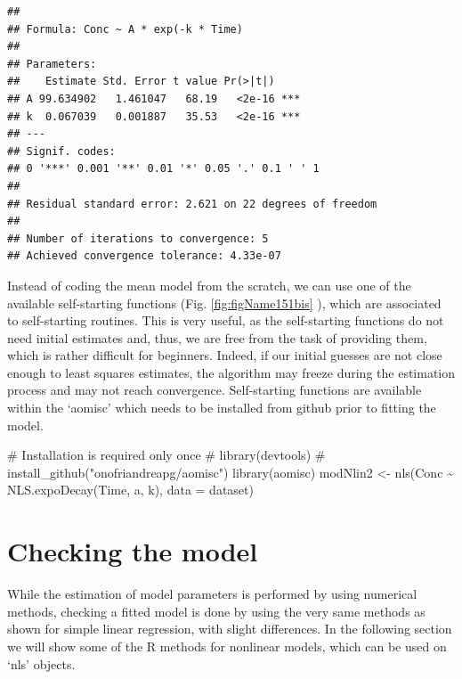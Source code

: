 \documentclass[a4paper,12pt,oneside]{book}
\newenvironment{Shaded}{\begin{snugshade}}{\end{snugshade}}
\newcommand{\SpecialCharTok}[1]{#1}
\newcommand{\CommentTok}[1]{#1}
\newcommand{\OtherTok}[1]{#1}
\newcommand{\FunctionTok}[1]{#1}
\newcommand{\AttributeTok}[1]{#1}
\newcommand{\NormalTok}[1]{#1}
\begin{document}
\begin{verbatim}
## 
## Formula: Conc ~ A * exp(-k * Time)
## 
## Parameters:
##    Estimate Std. Error t value Pr(>|t|)    
## A 99.634902   1.461047   68.19   <2e-16 ***
## k  0.067039   0.001887   35.53   <2e-16 ***
## ---
## Signif. codes:  
## 0 '***' 0.001 '**' 0.01 '*' 0.05 '.' 0.1 ' ' 1
## 
## Residual standard error: 2.621 on 22 degrees of freedom
## 
## Number of iterations to convergence: 5 
## Achieved convergence tolerance: 4.33e-07
\end{verbatim}

Instead of coding the mean model from the scratch, we can use one of the available self-starting functions (Fig. \ref{fig:figName151bis} ), which are associated to self-starting routines. This is very useful, as the self-starting functions do not need initial estimates and, thus, we are free from the task of providing them, which is rather difficult for beginners. Indeed, if our initial guesses are not close enough to least squares estimates, the algorithm may freeze during the estimation process and may not reach convergence. Self-starting functions are available within the `aomisc' which needs to be installed from github prior to fitting the model.

\begin{Shaded}
\begin{Highlighting}[]
\CommentTok{\# Installation is required only once}
\CommentTok{\# library(devtools)}
\CommentTok{\# install\_github("onofriandreapg/aomisc")}
\FunctionTok{library}\NormalTok{(aomisc)}
\NormalTok{modNlin2 }\OtherTok{\textless{}{-}} \FunctionTok{nls}\NormalTok{(Conc }\SpecialCharTok{\textasciitilde{}} \FunctionTok{NLS.expoDecay}\NormalTok{(Time, a, k),}
               \AttributeTok{data =}\NormalTok{ dataset)}
\end{Highlighting}
\end{Shaded}

\hypertarget{checking-the-model}{%
\section{Checking the model}\label{checking-the-model}}

While the estimation of model parameters is performed by using numerical methods, checking a fitted model is done by using the very same methods as shown for simple linear regression, with slight differences. In the following section we will show some of the R methods for nonlinear models, which can be used on `nls' objects.
\end{document}
